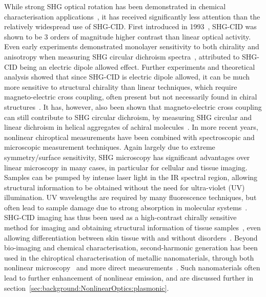While strong SHG optical rotation has been demonstrated in chemical characterisation applications~\cite{Byers1994, Pena2006}, it has received significantly less attention than the relatively widespread use of SHG-CID. First introduced in 1993~\cite{Petralli-Mallow1993}, SHG-CID was shown to be 3 orders of magnitude higher contrast than linear optical activity.
Even early experiments demonstrated monolayer sensitivity to both chirality and anisotropy when measuring SHG circular dichroism spectra~\cite{Byers1994a}, attributed to SHG-CID being an electric dipole allowed effect. Further experiments and theoretical analysis showed that since SHG-CID is electric dipole allowed, it can be much more sensitive to structural chirality than linear techniques, which require magneto-electric cross coupling, often present but not necessarily found in chiral structures~\cite{Verbiest1994b}. It has, however, also been shown that magneto-electric cross coupling can still contribute to SHG circular dichroism, by measuring SHG circular and linear dichroism in helical aggregates of achiral molecules~\cite{Fujiwara2004}.
In more recent years, nonlinear chiroptical measurements have been combined with spectroscopic and microscopic measurement techniques. Again largely due to extreme symmetry/surface sensitivity, SHG microscopy has significant advantages over linear microscopy in many cases, in particular for cellular and tissue imaging. 
Samples can be pumped by intense laser light in the IR spectral region, allowing structural information to be obtained without the need for ultra-violet (UV) illumination. UV wavelengths are required by many fluorescence techniques, but often lead to sample damage due to strong absorption in molecular systems~\cite{Campagnola2011}. 
SHG-CID imaging has thus been used as a high-contrast chirally sensitive method for imaging and obtaining structural information of tissue samples~\cite{Lee2013a, Campbell2016}, even allowing differentiation between skin tissue with and without disorders~\cite{Chen2012}. Beyond bio-imaging and chemical characterisation, second-harmonic generation has been used in the chiroptical characterisation of metallic nanomaterials, through both nonlinear microscopy~\cite{Huttunen2011, Valev2012a, Mamonov2017} and more direct measurements~\cite{Guerrero-Martinez2011, Belardini2014, Hooper2017}. Such nanomaterials often lead to further enhancement of nonlinear emission, and are discussed further in section~\ref{sec:background:NonlinearOptics:plasmonic}. 



